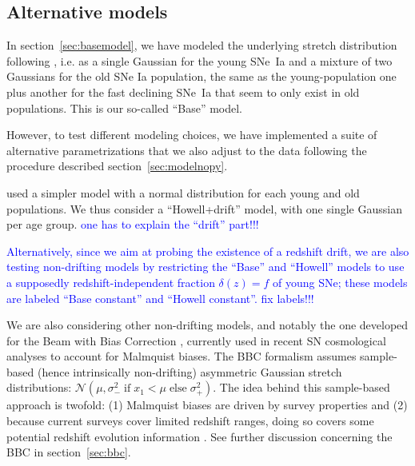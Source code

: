 \documentclass[]{aa} %
\newcommand{\nn}[1]{{\textcolor[rgb]{1, 0.27, 0}{#1}}}
\newcommand{\yc}[1]{{\textcolor{blue}{#1}}}
\begin{document}
\subsection{Alternative models}
\label{sec:othermodel}

In section~\nn{\ref{sec:basemodel}}, we have modeled the underlying stretch
distribution following \cite{rigault2018}, i.e. as a single Gaussian for the young SNe~Ia and a mixture of two
Gaussians for the old SNe Ia population, the same as the young-population
one plus another for the fast declining SNe~Ia that seem to only exist in old
populations. This is our so-called ``Base'' model.

However, to test \nn{different modeling choices}, we have implemented a suite
of alternative parametrizations that we also adjust to the data following the procedure
described section~\ref{sec:modelnopy}. 


\cite{howell2007} used a simpler model with a normal distribution for each young 
and old populations. \nn{We thus consider a ``Howell+drift'' model, with one 
single Gaussian per age group}. \yc{one has to explain the ``drift'' part!!!}

\yc{Alternatively, since we aim at probing the existence of a redshift drift, 
we are also testing non-drifting models by restricting the ``Base'' and ``Howell'' models to use a supposedly redshift-independent fraction $\delta(z) = f$ of young SNe; these models are labeled ``Base constant'' and ``Howell constant''.} \yc{fix labels!!!}

We are also considering other non-drifting models, and notably the one
developed for the Beam with Bias Correction \cite[BBC,][]{scolnic2016,
kessler2017}, currently used in recent SN cosmological analyses
\cite[e.g.][]{scolnic2018a, descosmopaper2019, riess2016, riess2019} to account
for Malmquist biases. The BBC formalism assumes sample-based (hence
intrinsically non-drifting) asymmetric Gaussian stretch distributions: $\mathcal{N}\left(\mu,
\sigma_{-}^2\;\text{if}\;x_1<\mu\;\text{else}\;\sigma_{+}^2\right)$. The
idea behind this sample-based approach is twofold: (1) Malmquist biases are
driven by survey properties and (2) because current surveys cover limited
redshift ranges, doing so covers some potential redshift evolution information
\citep{scolnic2016, scolnic2018a}. See further discussion concerning the BBC in section~\ref{sec:bbc}. 
\end{document}
